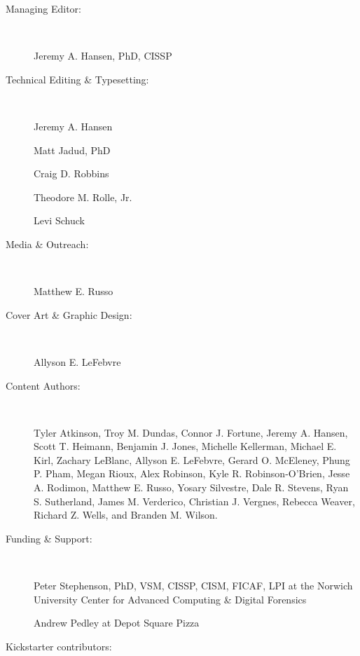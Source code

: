 \documentclass[11pt,final]{book}
\begin{document}
 \begin{description}

 \item[Managing Editor:] ~
 
 Jeremy A. Hansen, PhD, CISSP

 \item[Technical Editing \& Typesetting:] ~
 
 Jeremy A. Hansen
 
 Matt Jadud, PhD
 
 Craig D. Robbins
 
 Theodore M. Rolle, Jr.
 
 Levi Schuck

 \item[Media \& Outreach:] ~
 
 Matthew E. Russo

 \item[Cover Art \& Graphic Design:] ~
 
 Allyson E. LeFebvre

 \item[Content Authors:]\label{ContentAuthors} ~
 
Tyler Atkinson,
Troy M. Dundas,
Connor J. Fortune,
Jeremy A. Hansen,
Scott T. Heimann,
Benjamin J. Jones,
Michelle Kellerman,
Michael E. Kirl,
Zachary LeBlanc,
Allyson E. LeFebvre,
Gerard O. McEleney,
Phung P. Pham,
Megan Rioux,
Alex Robinson,
Kyle R. Robinson-O'Brien,
Jesse A. Rodimon,
Matthew E. Russo,
Yosary Silvestre,
Dale R. Stevens,
Ryan S. Sutherland,
James M. Verderico,
Christian J. Vergnes,
Rebecca Weaver,
Richard Z. Wells, and
Branden M. Wilson.

 \item[Funding \& Support:] ~
 
Peter Stephenson, PhD, VSM, CISSP, CISM, FICAF, LPI at the Norwich University Center for Advanced Computing \& Digital Forensics

Andrew Pedley at Depot Square Pizza

 \item[Kickstarter contributors:] ~  
 

\end{description}
\end{document}
